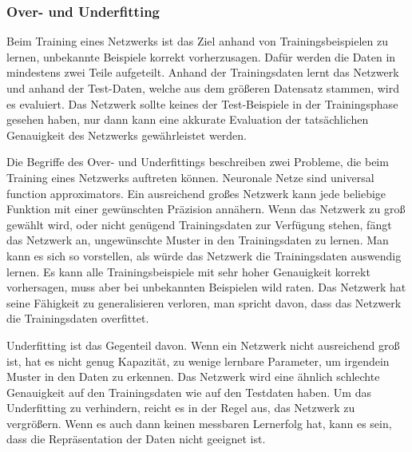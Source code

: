 \subsubsection{Over- und Underfitting}
Beim Training eines Netzwerks ist das Ziel anhand von Trainingsbeispielen zu lernen, unbekannte Beispiele korrekt vorherzusagen.
Dafür werden die Daten in mindestens zwei Teile aufgeteilt.
Anhand der Trainingsdaten lernt das Netzwerk und anhand der Test-Daten, welche aus dem größeren Datensatz stammen, wird es evaluiert.
Das Netzwerk sollte keines der Test-Beispiele in der Trainingsphase gesehen haben, nur dann kann eine akkurate Evaluation der tatsächlichen Genauigkeit des Netzwerks gewährleistet werden.

Die Begriffe des Over- und Underfittings beschreiben zwei Probleme, die beim Training eines Netzwerks auftreten können.
Neuronale Netze sind universal function approximators.
Ein ausreichend großes Netzwerk kann jede beliebige Funktion mit einer gewünschten Präzision annähern.
Wenn das Netzwerk zu groß gewählt wird, oder nicht genügend Trainingsdaten zur Verfügung stehen, fängt das Netzwerk an, ungewünschte Muster in den Trainingsdaten zu lernen.
Man kann es sich so vorstellen, als würde das Netzwerk die Trainingsdaten auswendig lernen.
Es kann alle Trainingsbeispiele mit sehr hoher Genauigkeit korrekt vorhersagen, muss aber bei unbekannten Beispielen wild raten.
Das Netzwerk hat seine Fähigkeit zu generalisieren verloren, man spricht davon, dass das Netzwerk die Trainingsdaten overfittet.

Underfitting ist das Gegenteil davon.
Wenn ein Netzwerk nicht ausreichend groß ist, hat es nicht genug Kapazität, zu wenige lernbare Parameter, um irgendein Muster in den Daten zu erkennen.
Das Netzwerk wird eine ähnlich schlechte Genauigkeit auf den Trainingsdaten wie auf den Testdaten haben.
Um das Underfitting zu verhindern, reicht es in der Regel aus, das Netzwerk zu vergrößern.
Wenn es auch dann keinen messbaren Lernerfolg hat, kann es sein, dass die Repräsentation der Daten nicht geeignet ist.

